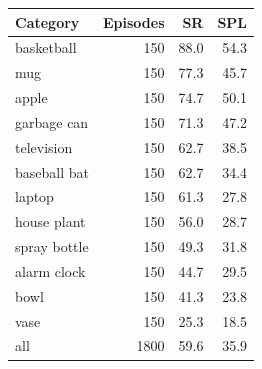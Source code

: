 \begin{tabular*}{\linewidth}{@{\extracolsep{\fill}}lrrr@{}}
\toprule
Category & Episodes & SR & SPL\\
\midrule
basketball & 150 & 88.0 & 54.3\\
mug & 150 & 77.3 & 45.7\\
apple & 150 & 74.7 & 50.1\\
garbage can & 150 & 71.3 & 47.2\\
television & 150 & 62.7 & 38.5\\
baseball bat & 150 & 62.7 & 34.4\\
laptop & 150 & 61.3 & 27.8\\
house plant & 150 & 56.0 & 28.7\\
spray bottle & 150 & 49.3 & 31.8\\
alarm clock & 150 & 44.7 & 29.5\\
bowl & 150 & 41.3 & 23.8\\
vase & 150 & 25.3 & 18.5\\
\midrule
all & 1800 & 59.6 & 35.9\\
\bottomrule
\end{tabular*}
